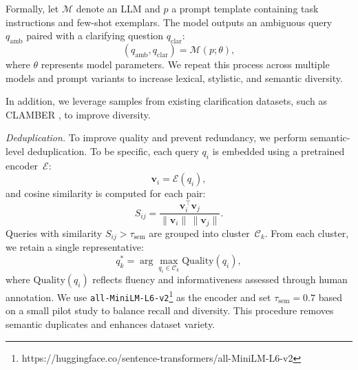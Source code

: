\documentclass[sigconf]{acmart}
\begin{document}
Formally, let $\mathcal{M}$ denote an LLM and $p$ a prompt template containing task instructions and few-shot exemplars.  
The model outputs an ambiguous query $q_{\text{amb}}$ paired with a clarifying question $q_{\text{clar}}$:
\begin{equation}
(q_{\text{amb}}, q_{\text{clar}}) = \mathcal{M}(p; \theta),
\end{equation}
where $\theta$ represents model parameters.  
We repeat this process across multiple models and prompt variants to increase lexical, stylistic, and semantic diversity.

In addition, we leverage samples from existing clarification datasets, such as \textsc{CLAMBER} \cite{zhang2024clamber}, to improve diversity.

\textit{Deduplication.}
To improve quality and prevent redundancy, we perform semantic-level deduplication.  
To be specific, each query $q_i$ is embedded using a pretrained encoder~$\mathcal{E}$:
\begin{equation}
\mathbf{v}_i = \mathcal{E}(q_i),
\end{equation}
and cosine similarity is computed for each pair:
\begin{equation}
S_{ij} = \frac{\mathbf{v}_i^\top \mathbf{v}_j}{\|\mathbf{v}_i\| \, \|\mathbf{v}_j\|}.
\end{equation}
Queries with similarity $S_{ij} > \tau_{\text{sem}}$ are grouped into cluster~$\mathcal{C}_k$.  
From each cluster, we retain a single representative:
\begin{equation}
q_k^{*} = \arg\max_{q_i \in \mathcal{C}_k} \text{Quality}(q_i),
\end{equation}
where $\text{Quality}(q_i)$ reflects fluency and informativeness assessed through human annotation.  
We use \texttt{all-MiniLM-L6-v2}\footnote{https://huggingface.co/sentence-transformers/all-MiniLM-L6-v2}
as the encoder and set $\tau_{\text{sem}} = 0.7$ based on a small pilot study to balance recall and diversity.  
This procedure removes semantic duplicates and enhances dataset variety.
\end{document}
